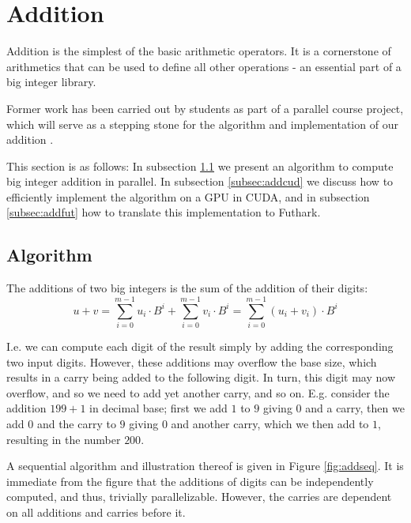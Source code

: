 \section{Addition}
\label{sec:add}

Addition is the simplest of the basic arithmetic operators. It is a cornerstone
of arithmetics that can be used to define all other operations - an essential
part of a big integer library.

Former work has been carried out by students as part of a parallel course
project, which will serve as a stepping stone for the algorithm and
implementation of our addition \cite{DPPproject}.

This section is as follows: In subsection \ref{subsec:addalg} we present an
algorithm to compute big integer addition in parallel. In subsection
\ref{subsec:addcud} we discuss how to efficiently implement the algorithm on a
GPU in CUDA, and in subsection \ref{subsec:addfut} how to translate this
implementation to Futhark.

\subsection{Algorithm}
\label{subsec:addalg}

The additions of two big integers is the sum of the addition of their digits:
\begin{equation}
  \label{eq:add}
  u + v = \sum_{i=0}^{m-1}u_i\cdot B^{i} + \sum_{i=0}^{m-1}v_i\cdot B^{i} = \sum_{i=0}^{m-1}(u_i+v_i)\cdot B^{i}
\end{equation}

I.e. we can compute each digit of the result simply by adding the corresponding
two input digits. However, these additions may overflow the base size, which
results in a carry being added to the following digit. In turn, this digit may
now overflow, and so we need to add yet another carry, and so on. E.g. consider
the addition $199 + 1$ in decimal base; first we add $1$ to $9$ giving $0$ and a
carry, then we add $0$ and the carry to $9$ giving $0$ and another carry, which
we then add to $1$, resulting in the number $200$.

A sequential algorithm and illustration thereof is given in Figure
\ref{fig:addseq}. It is immediate from the figure that the additions of digits
can be independently computed, and thus, trivially parallelizable. However, the
carries are dependent on all additions and carries before it.

